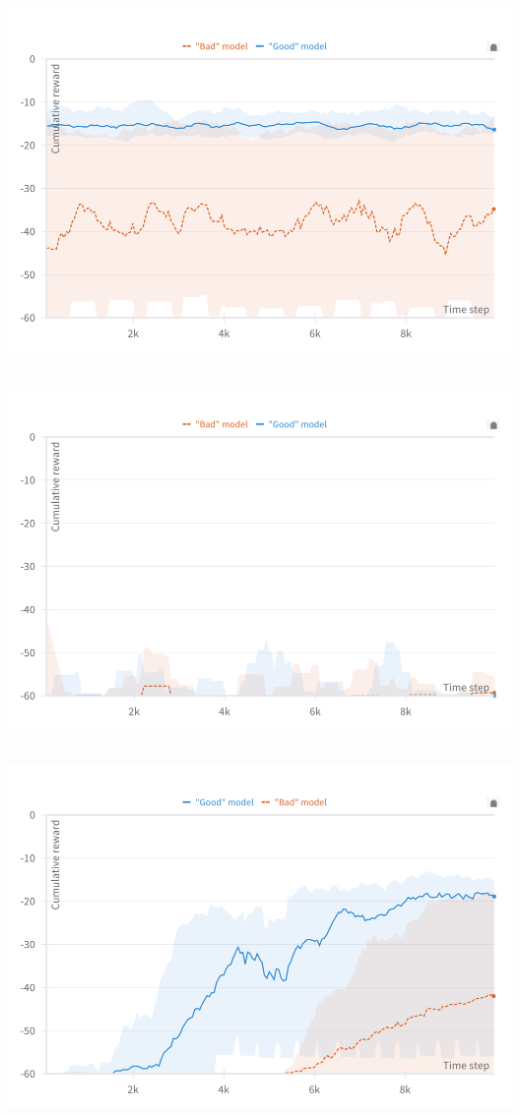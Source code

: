 \documentclass[
  letterpaper,
  DIV=11,
  numbers=noendperiod,
  oneside]{scrartcl}
\begin{document}
\includegraphics{figs/baseline-n10.png}

\subsection{}\label{section-44}

\includegraphics{figs/baseline-n1.png}

\subsection{}\label{section-45}

\begin{center}
\includegraphics{figs/reward_mass.png}
\end{center}
\end{document}
